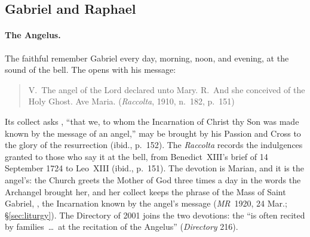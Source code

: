 \sectionguard
\subsection{Gabriel and Raphael}

\paragraph{The Angelus.} The faithful remember Gabriel every day, morning,
noon, and evening, at the sound of the bell. The  opens
with his message:
\begin{quote}

V.~The angel of the Lord declared unto Mary. R.~And she conceived of
the Holy Ghost. Ave Maria. (\emph{Raccolta}, 1910, n.~182, p.~151)
\end{quote}
Its collect asks , ``that we, to whom the Incarnation of Christ thy Son
was made known by the message of an angel,'' may be brought by his
Passion and Cross to the glory of the resurrection (ibid., p.~152). The
\emph{Raccolta} records the indulgences granted to those who say it at the
bell, from Benedict~XIII's brief of 14 September 1724 to Leo~XIII (ibid.,
p.~151). The devotion is Marian, and it is the angel's: the Church greets
the Mother of God three times a day in the words the Archangel brought
her, and her collect keeps the phrase of the Mass of Saint Gabriel,
, the Incarnation known by the angel's message
(\emph{MR}~1920, 24 Mar.; \S\ref{sec:liturgy}). The Directory of
2001 joins the two devotions: the  ``is often recited by
families~\dots\ at the recitation of the Angelus'' (\emph{Directory} 216).


